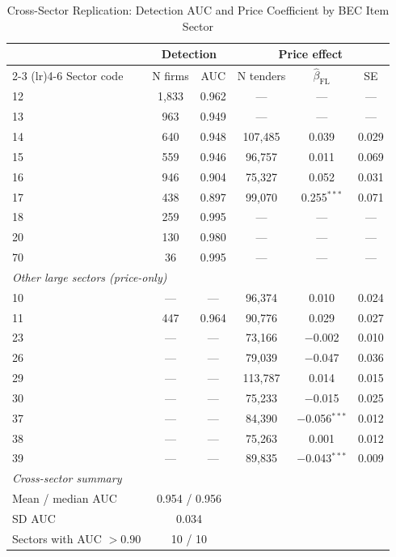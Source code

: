 \begin{table}[htbp]
\centering
\caption{Cross-Sector Replication: Detection AUC and Price Coefficient by BEC Item Sector}
\label{tab:cross_sector}
\begin{threeparttable}
\small
\begin{tabular}{lccccc}
\toprule
 & \multicolumn{2}{c}{Detection} & \multicolumn{3}{c}{Price effect} \\
\cmidrule(lr){2-3} \cmidrule(lr){4-6}
Sector code & N firms & AUC & N tenders & $\hat{\beta}_{\mathrm{FL}}$ & SE \\
\midrule
12 & 1{,}833 & 0.962 & --- & --- & --- \\
13 & 963 & 0.949 & --- & --- & --- \\
14 & 640 & 0.948 & 107{,}485 & 0.039 & 0.029 \\
15 & 559 & 0.946 & 96{,}757 & 0.011 & 0.069 \\
16 & 946 & 0.904 & 75{,}327 & 0.052 & 0.031 \\
17 & 438 & 0.897 & 99{,}070 & 0.255$^{***}$ & 0.071 \\
18 & 259 & 0.995 & --- & --- & --- \\
20 & 130 & 0.980 & --- & --- & --- \\
70 & 36 & 0.995 & --- & --- & --- \\
\midrule
\multicolumn{2}{l}{\textit{Other large sectors (price-only)}} & & & & \\
10 & --- & --- & 96{,}374 & 0.010 & 0.024 \\
11 & 447 & 0.964 & 90{,}776 & 0.029 & 0.027 \\
23 & --- & --- & 73{,}166 & $-$0.002 & 0.010 \\
26 & --- & --- & 79{,}039 & $-$0.047 & 0.036 \\
29 & --- & --- & 113{,}787 & 0.014 & 0.015 \\
30 & --- & --- & 75{,}233 & $-$0.015 & 0.025 \\
37 & --- & --- & 84{,}390 & $-$0.056$^{***}$ & 0.012 \\
38 & --- & --- & 75{,}263 & 0.001 & 0.012 \\
39 & --- & --- & 89{,}835 & $-$0.043$^{***}$ & 0.009 \\
\midrule
\multicolumn{6}{l}{\textit{Cross-sector summary}} \\
\quad Mean / median AUC & \multicolumn{2}{c}{0.954 / 0.956} & & & \\
\quad SD AUC & \multicolumn{2}{c}{0.034} & & & \\
\quad Sectors with AUC $> 0.90$ & \multicolumn{2}{c}{10 / 10} & & & \\

\end{tabular}
\end{threeparttable}
\end{table}
